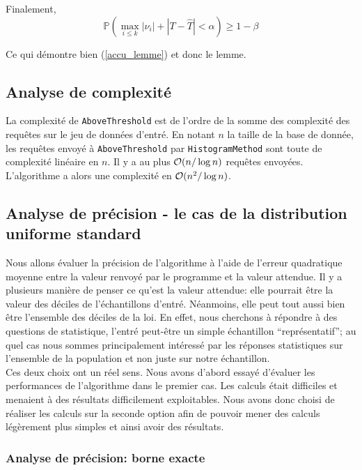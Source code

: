 Finalement, 
\[
    \mathbb P\left( \max_{i \leq k} |\nu_i| + |T - \hat T| < \alpha  \right)  \geq 1 - \beta
\]

Ce qui démontre bien (\ref{accu_lemme}) et donc le lemme.\\

\subsection{Analyse de complexité}

La complexité de \texttt{AboveThreshold} est de l'ordre de la somme des complexité des requêtes sur le jeu de données d'entré. En notant \(n\) la taille de la base de donnée, les requêtes envoyé à \texttt{AboveThreshold} par \texttt{HistogramMethod} sont toute de complexité linéaire en \(n\). Il y a au plus \(\mathcal{O}(n/\log n)\) requêtes envoyées. L'algorithme a alors une complexité en \(\mathcal{O}(n^2/\log n)\).

\subsection{Analyse de précision - le cas de la distribution uniforme standard}

Nous allons évaluer la précision de l'algorithme à l'aide de l'erreur quadratique moyenne entre la valeur renvoyé par le programme et la valeur attendue. Il y a plusieurs manière de penser ce qu'est la valeur attendue: elle pourrait être la valeur des déciles de l'échantillons d'entré. Néanmoins, elle peut tout aussi bien être l'ensemble des déciles de la loi. En effet, nous cherchons à répondre à des questions de statistique, l'entré peut-être un simple échantillon ``représentatif'';  au quel cas nous sommes principalement intéressé par les réponses statistiques sur l'ensemble de la population et non juste sur notre échantillon.\\

Ces deux choix ont un réel sens. Nous avons d'abord essayé d'évaluer les performances de l'algorithme dans le premier cas. Les calculs était difficiles et menaient à des résultats difficilement exploitables. Nous avons donc choisi de réaliser les calculs sur la seconde option afin de pouvoir mener des calculs légèrement plus simples et ainsi avoir des résultats.\\

\subsubsection{Analyse de précision: borne exacte}

